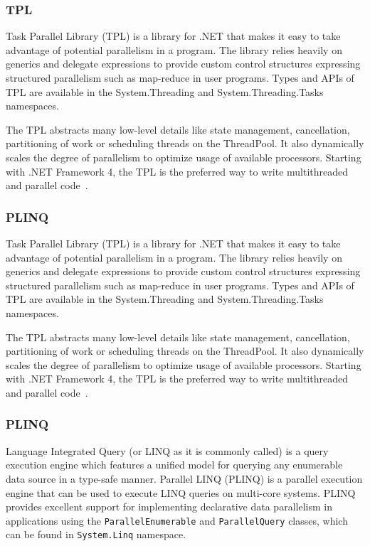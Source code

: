 \subsubsection{TPL}
\label{sec:TPL}
Task Parallel Library (TPL) is a library for .NET that makes it easy to take advantage of potential parallelism in a program. The library relies heavily on generics and delegate expressions to provide custom control structures expressing structured parallelism such as map-reduce in user programs. Types and APIs of TPL are available in the System.Threading and System.Threading.Tasks namespaces.

The TPL abstracts many low-level details like state management, cancellation, partitioning of work or scheduling threads on the ThreadPool. It also dynamically scales the degree of parallelism to optimize usage of available processors. Starting with .NET Framework 4, the TPL is the preferred way to write multithreaded and parallel code~\cite{Leijen2009}.

\subsubsection{PLINQ}
\label{sec:PLINQ}
Task Parallel Library (TPL) is a library for .NET that makes it easy to take advantage of potential parallelism in a program. The library relies heavily on generics and delegate expressions to provide custom control structures expressing structured parallelism such as map-reduce in user programs. Types and APIs of TPL are available in the System.Threading and System.Threading.Tasks namespaces.

The TPL abstracts many low-level details like state management, cancellation, partitioning of work or scheduling threads on the ThreadPool. It also dynamically scales the degree of parallelism to optimize usage of available processors. Starting with .NET Framework 4, the TPL is the preferred way to write multithreaded and parallel code~\cite{Leijen2009}.

\subsubsection{PLINQ}
\label{sec:PLINQ}
Language Integrated Query (or LINQ as it is commonly called) is a query execution engine which features a unified model for querying any enumerable data source in a type-safe manner. Parallel LINQ (PLINQ) is a parallel execution engine that can be used to execute LINQ queries on multi-core systems. PLINQ provides excellent support for implementing declarative data parallelism in applications using the \texttt{ParallelEnumerable} and \texttt{ParallelQuery} classes, which can be found in \texttt{System.Linq} namespace.

